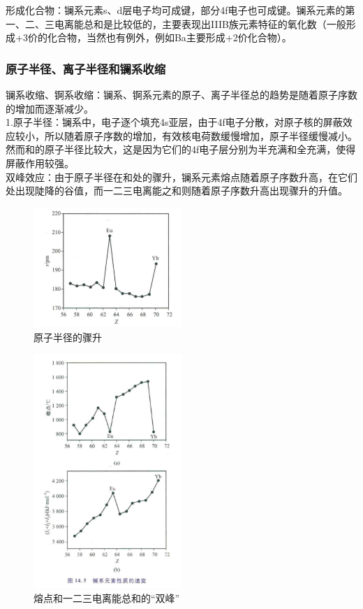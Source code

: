 \documentclass[a4paper,UTF8]{article}
\begin{document}
形成化合物：镧系元素s、d层电子均可成键，部分4f电子也可成键。镧系元素的第一、二、三电离能总和是比较低的，主要表现出IIIB族元素特征的氧化数（一般形成+3价的化合物，当然也有例外，例如Ba主要形成+2价化合物）。

\subsubsection{原子半径、离子半径和镧系收缩}

镧系收缩、锕系收缩：镧系、锕系元素的原子、离子半径总的趋势是随着原子序数的增加而逐渐减少。\\

1.原子半径：镧系中，电子逐个填充4s亚层，由于4f电子分散，对原子核的屏蔽效应较小，所以随着原子序数的增加，有效核电荷数缓慢增加，原子半径缓慢减小。然而和的原子半径比较大，这是因为它们的4f电子层分别为半充满和全充满，使得屏蔽作用较强。\\

双峰效应：由于原子半径在和处的骤升，镧系元素熔点随着原子序数升高，在它们处出现陡降的谷值，而一二三电离能之和则随着原子序数升高出现骤升的升值。\\

\begin{figure}[htpb]
	\centering
	\includegraphics[width=0.5\textwidth]{figure//双峰效应1.png}
	\caption{原子半径的骤升}
	\label{fig:}
\end{figure}

\begin{figure}[htpb]
	\centering
	\includegraphics[width=0.5\textwidth]{figure//双峰效应2.png}
	\caption{熔点和一二三电离能总和的“双峰”}
	\label{fig:}
\end{figure}
\end{document}
